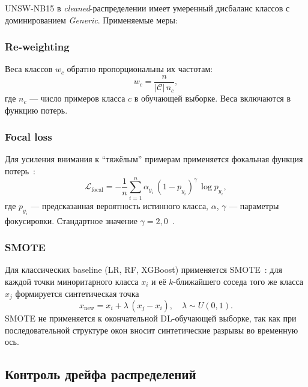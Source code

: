 UNSW-NB15 в \emph{cleaned}-распределении имеет умеренный дисбаланс
классов с доминированием \emph{Generic}. Применяемые меры:

\subsubsection{Re-weighting}

Веса классов \(w_c\) обратно пропорциональны их частотам:
\begin{equation}
w_c = \frac{n}{|\mathcal{C}|\,n_c},
\label{eq:reweight}
\end{equation}
где \(n_c\) --- число примеров класса \(c\) в обучающей выборке. Веса
включаются в функцию потерь.

\subsubsection{Focal loss}

Для усиления внимания к ``тяжёлым'' примерам применяется фокальная функция
потерь~\cite{lin2017focal}:
\begin{equation}
\mathcal{L}_{\text{focal}} =
- \frac{1}{n}\sum_{i=1}^{n}
  \alpha_{y_i}\,(1-p_{y_i})^{\gamma}\,\log p_{y_i},
\label{eq:focal}
\end{equation}
где \(p_{y_i}\) --- предсказанная вероятность истинного класса,
\(\alpha\), \(\gamma\) --- параметры фокусировки. Стандартное значение
\(\gamma = 2{,}0\)~\cite{lin2017focal}.

\subsubsection{SMOTE}

Для классических baseline (LR, RF, XGBoost) применяется
SMOTE~\cite{chawla2002smote}: для каждой точки миноритарного класса
\(x_i\) и её \(k\)-ближайшего соседа того же класса \(x_j\) формируется
синтетическая точка
\begin{equation}
x_{\text{new}} = x_i + \lambda\,(x_j - x_i),\quad \lambda \sim U(0, 1).
\label{eq:smote}
\end{equation}
SMOTE не применяется к окончательной DL-обучающей выборке, так как при
последовательной структуре окон вносит синтетические разрывы во временную
ось.

\subsection{Контроль дрейфа распределений}

